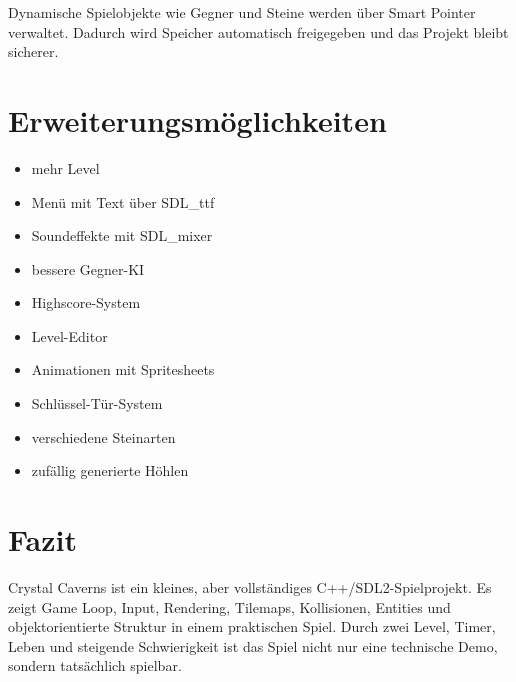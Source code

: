 \documentclass[12pt,a4paper]{article}
\begin{document}
Dynamische Spielobjekte wie Gegner und Steine werden über Smart Pointer verwaltet. Dadurch wird Speicher automatisch freigegeben und das Projekt bleibt sicherer.

\section{Erweiterungsmöglichkeiten}

\begin{itemize}
    \item mehr Level
    \item Menü mit Text über SDL\_ttf
    \item Soundeffekte mit SDL\_mixer
    \item bessere Gegner-KI
    \item Highscore-System
    \item Level-Editor
    \item Animationen mit Spritesheets
    \item Schlüssel-Tür-System
    \item verschiedene Steinarten
    \item zufällig generierte Höhlen
\end{itemize}

\section{Fazit}

Crystal Caverns ist ein kleines, aber vollständiges C++/SDL2-Spielprojekt. Es zeigt Game Loop, Input, Rendering, Tilemaps, Kollisionen, Entities und objektorientierte Struktur in einem praktischen Spiel. Durch zwei Level, Timer, Leben und steigende Schwierigkeit ist das Spiel nicht nur eine technische Demo, sondern tatsächlich spielbar.
\end{document}
